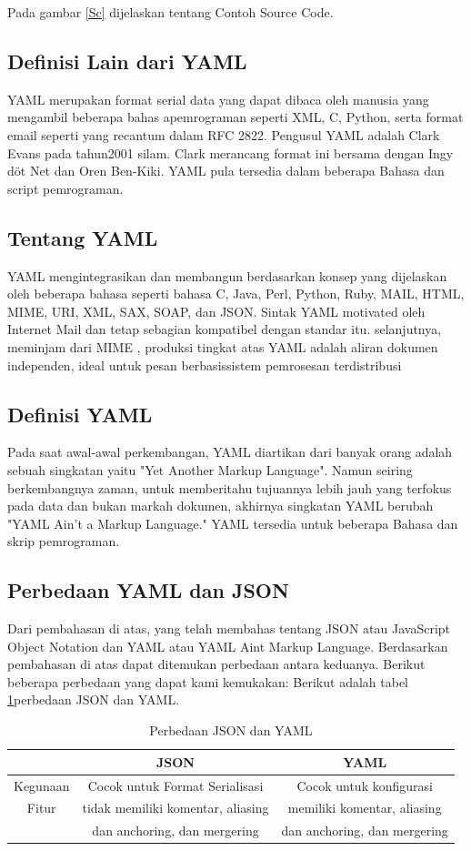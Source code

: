Pada gambar \ref{Sc} dijelaskan tentang Contoh Source Code.
\subsection{Definisi Lain dari YAML}
YAML merupakan format serial data yang dapat dibaca oleh manusia yang mengambil beberapa bahas apemrograman seperti XML, C, Python, serta format email seperti yang recantum dalam RFC 2822. Pengusul YAML adalah Clark Evans pada tahun2001 silam. Clark merancang format ini bersama dengan Ingy döt Net dan Oren Ben-Kiki. YAML pula tersedia dalam beberapa Bahasa dan script pemrograman.
\subsection{Tentang YAML}
YAML mengintegrasikan dan membangun berdasarkan konsep yang dijelaskan oleh beberapa bahasa seperti bahasa C, Java, Perl, Python, Ruby, MAIL,  HTML, MIME, URI, XML, SAX, SOAP, dan JSON.
Sintak YAML motivated oleh Internet Mail  dan tetap sebagian kompatibel dengan standar itu. selanjutnya, meminjam dari MIME , produksi tingkat atas YAML adalah aliran dokumen independen, ideal untuk pesan berbasissistem pemrosesan terdistribusi
\subsection{Definisi YAML}
Pada saat awal-awal perkembangan, YAML diartikan dari banyak orang adalah sebuah singkatan yaitu "Yet Another Markup Language". Namun seiring berkembangnya zaman, untuk memberitahu tujuannya lebih jauh yang terfokus pada data dan bukan markah dokumen, akhirnya singkatan YAML berubah "YAML Ain't a Markup Language." YAML tersedia untuk beberapa Bahasa dan skrip pemrograman.
\subsection{Perbedaan YAML dan JSON}
Dari pembahasan di atas, yang telah membahas tentang JSON atau JavaScript Object Notation dan YAML atau YAML Aint Markup Language. Berdasarkan pembahasan di atas dapat ditemukan perbedaan antara keduanya. Berikut beberapa perbedaan yang dapat kami kemukakan:
Berikut adalah tabel \ref{table:json}perbedaan JSON dan YAML.
\begin{table}[h]
\caption{Perbedaan JSON dan YAML}
\centering
\begin{tabular}{ccc}
\hline
&JSON&YAML\\
\hline
Kegunaan&Cocok untuk Format Serialisasi&Cocok untuk konfigurasi\\
\hline
Fitur&tidak memiliki komentar, aliasing&memiliki komentar, aliasing \\
&dan anchoring, dan  mergering& dan anchoring, dan  mergering\\
\hline
\end{tabular}
\label{table:json}
\end{table}

